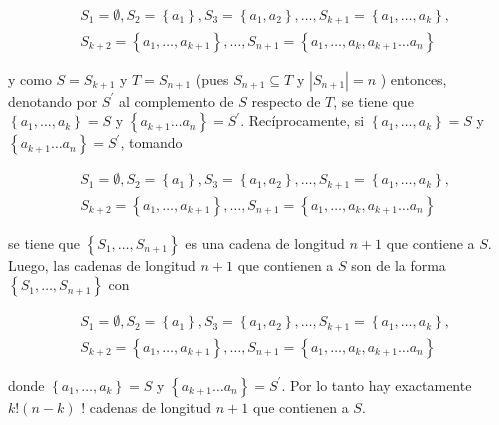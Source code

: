 \documentclass[10pt]{article}
\begin{document}
$$
\begin{aligned}
& S_{1}=\emptyset, S_{2}=\left\{a_{1}\right\}, S_{3}=\left\{a_{1}, a_{2}\right\}, \ldots, S_{k+1}=\left\{a_{1}, \ldots, a_{k}\right\}, \\
& S_{k+2}=\left\{a_{1}, \ldots, a_{k+1}\right\}, \ldots, S_{n+1}=\left\{a_{1}, \ldots, a_{k}, a_{k+1} \ldots a_{n}\right\}
\end{aligned}
$$

y como $S=S_{k+1}$ y $T=S_{n+1}$ (pues $S_{n+1} \subseteq T$ y $\left|S_{n+1}\right|=n$ ) entonces, denotando por $S^{\prime}$ al complemento de $S$ respecto de $T$, se tiene que $\left\{a_{1}, \ldots, a_{k}\right\}=S$ y $\left\{a_{k+1} \ldots a_{n}\right\}=S^{\prime}$. Recíprocamente, si $\left\{a_{1}, \ldots, a_{k}\right\}=S$ y $\left\{a_{k+1} \ldots a_{n}\right\}=S^{\prime}$, tomando

$$
\begin{aligned}
& S_{1}=\emptyset, S_{2}=\left\{a_{1}\right\}, S_{3}=\left\{a_{1}, a_{2}\right\}, \ldots, S_{k+1}=\left\{a_{1}, \ldots, a_{k}\right\}, \\
& S_{k+2}=\left\{a_{1}, \ldots, a_{k+1}\right\}, \ldots, S_{n+1}=\left\{a_{1}, \ldots, a_{k}, a_{k+1} \ldots a_{n}\right\}
\end{aligned}
$$

se tiene que $\left\{S_{1}, \ldots, S_{n+1}\right\}$ es una cadena de longitud $n+1$ que contiene a $S$.\\
Luego, las cadenas de longitud $n+1$ que contienen a $S$ son de la forma $\left\{S_{1}, \ldots, S_{n+1}\right\}$ con

$$
\begin{aligned}
& S_{1}=\emptyset, S_{2}=\left\{a_{1}\right\}, S_{3}=\left\{a_{1}, a_{2}\right\}, \ldots, S_{k+1}=\left\{a_{1}, \ldots, a_{k}\right\}, \\
& S_{k+2}=\left\{a_{1}, \ldots, a_{k+1}\right\}, \ldots, S_{n+1}=\left\{a_{1}, \ldots, a_{k}, a_{k+1} \ldots a_{n}\right\}
\end{aligned}
$$

donde $\left\{a_{1}, \ldots, a_{k}\right\}=S$ y $\left\{a_{k+1} \ldots a_{n}\right\}=S^{\prime}$. Por lo tanto hay exactamente $k!(n-k)$ ! cadenas de longitud $n+1$ que contienen a $S$.
\end{document}
